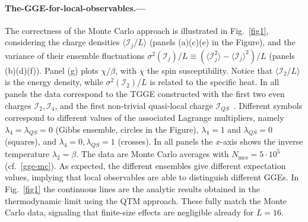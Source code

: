 \documentclass[twocolumn,superscriptaddress,prb,10pt]{revtex4-1}
\begin{document}
\paragraph*{The-GGE-for-local-observables.---} 

The correctness of the Monte Carlo approach is illustrated in Fig.~\ref{fig1}, considering 
the charge densities $\langle {\mathcal I}_j/L\rangle$ (panels (a)(c)(e) in the Figure), 
and the variance of their ensemble fluctuations $\sigma^2({\mathcal I}_j)/L\equiv
(\langle{\mathcal I}_j^2\rangle-\langle{\mathcal I}_j\rangle^2)/L$ (panels (b)(d)(f)). 
Panel (g) plots $\chi/\beta$, with $\chi$ the spin susceptibility. Notice that 
$\langle{\mathcal I}_2/L\rangle$ is the energy 
density, while $\sigma^2({\mathcal I}_2)/L$ is related to the specific heat. In all 
panels the data correspond to the TGGE constructed 
with the first two even charges ${\mathcal I}_2,{\mathcal I}_4$, and the first 
non-trivial quasi-local charge ${\mathcal I}_{QS}$~\cite{ilievski-2015,ilievski-2015a}. 
Different symbols correspond to different values of the associated Lagrange multipliers, 
namely $\lambda_4=\lambda_{QS}=0$ (Gibbs ensemble, circles in the Figure), $\lambda_4=1$ and 
$\lambda_{QS}=0$ (squares), and $\lambda_4=0,\lambda_{QS}=1$ (crosses). 
In all panels the $x$-axis shows the inverse temperature $\lambda_2=\beta$. The data 
are Monte Carlo averages with $N_{\textrm{mcs}}=5\cdot 10^5$ (cf.~\eqref{gge-mc}). 
As expected, the different ensembles give different expectation values, implying that 
local observables are able to distinguish different GGEs.
In Fig.~\ref{fig1} the continuous lines are the analytic results obtained 
in the thermodynamic limit using the QTM approach. These fully match the Monte 
Carlo data, signaling  that finite-size effects are negligible already for $L=16$.  
\end{document}
